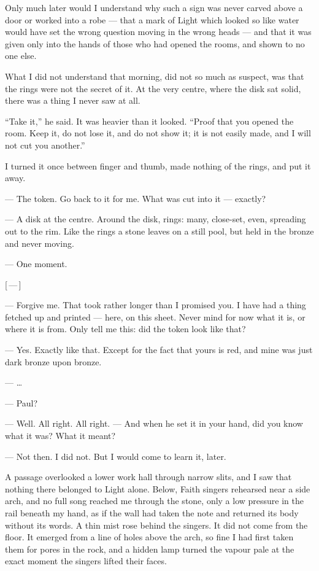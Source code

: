 Only much later would I understand why such a sign was never carved above a door or worked into a robe --- 
that a mark of Light which looked so like water would have set the wrong question moving in the wrong heads --- 
and that it was given only into the hands of those who had opened the rooms, and shown to no one else. 

What I did not understand that morning, did not so much as suspect, was that the rings were not the secret of it. 
At the very centre, where the disk sat solid, there was a thing I never saw at all.\par

``Take it,'' he said. It was heavier than it looked. 
``Proof that you opened the room. 
Keep it, do not lose it, and do not show it; it is not easily made, and I will not cut you another.''\par

I turned it once between finger and thumb, made nothing of the rings, and put it away.\par

\begin{room}

--- The token. Go back to it for me. What was cut into it --- exactly?

--- A disk at the centre. Around the disk, rings: many, close-set, even, spreading out to the rim. Like the rings a stone leaves on a still pool, but held in the bronze and never moving.

--- One moment.

\centerline{[\,---\,]}

--- Forgive me. That took rather longer than I promised you. I have had a thing fetched up and printed --- here, on this sheet. Never mind for now what it is, or where it is from. Only tell me this: did the token look like that?

--- Yes. Exactly like that. Except for the fact that yours is red, and mine was just dark bronze upon bronze.

--- \ldots{}

--- Paul?

--- Well. All right. All right. --- And when he set it in your hand, did you know what it was? What it meant?

--- Not then. I did not. But I would come to learn it, later.

\end{room}

A passage overlooked a lower work hall through narrow slits, and I saw that nothing there belonged to Light alone. 
Below, Faith singers rehearsed near a side arch, and no full song reached me through the stone, only a low pressure in the rail beneath my hand, 
as if the wall had taken the note and returned its body without its words. 
A thin mist rose behind the singers. 
It did not come from the floor. 
It emerged from a line of holes above the arch, so fine I had first taken them for pores in the rock, and a hidden lamp turned the vapour pale at the exact 
moment the singers lifted their faces.\par


